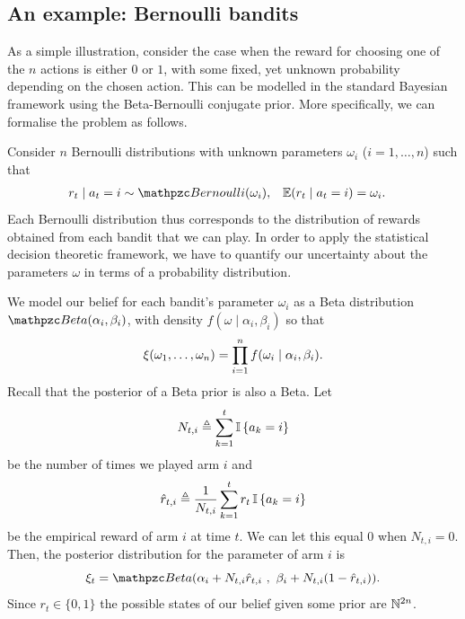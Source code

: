 \subsection{An example: Bernoulli bandits}
\label{sec:bernoulli-bandit-example}
As a simple illustration, consider the case when the reward for choosing one of the $n$ actions is either $0$ or $1$, with some fixed, yet unknown probability depending on the chosen action. This can be modelled in the standard Bayesian framework using the Beta-Bernoulli conjugate prior. More specifically, we can formalise the problem as follows.

Consider $n$ Bernoulli distributions with
unknown parameters $\omega_i$ ($i = 1, \ldots, n$) such that 
\begin{align}
  r_t \mid a_t = i &\sim
                     \Bernoulli(\omega_i),
  &
    \E(r_t  \mid a_t = i) &= \omega_i.
\end{align}
Each Bernoulli distribution thus corresponds to the distribution of
rewards obtained from each bandit that we can play.  In order to
apply the statistical decision theoretic framework, we have to
quantify our uncertainty about the parameters $\omega$ in terms of a
probability distribution.

We model our belief for each bandit's
parameter $\omega_i$ as a Beta distribution $\BetaDist(\alpha_i,
\beta_i)$, with density $f(\omega \mid \alpha_i, \beta_i)$ so that
\[
\xi(\omega_1, \ldots, \omega_n)
=
\prod_{i=1}^n f(\omega_i \mid \alpha_i, \beta_i).
\]
Recall that the posterior of a Beta prior is also a Beta. Let
\[
N_{t,i} \mathrel{\triangleq} \sum_{k=1}^t \mathop{\mbox{\ensuremath{\mathbb{I}}}}\left\{a_k = i\right\}
\]
be the number of times we played arm $i$ and
\[
\hat{r}_{t,i} \mathrel{\triangleq} \frac{1}{N_{t,i}} \sum_{k=1}^t r_t \mathop{\mbox{\ensuremath{\mathbb{I}}}}\left\{a_k = i\right\}
\]
be the
\alert{empirical reward} of arm $i$ at time $t$. We
can let this equal $0$ when $N_{t,i} = 0$.
Then, the posterior distribution for the parameter of arm $i$ is
\[
\bel_t = \BetaDist(\alpha_i + N_{t,i} \hat{r}_{t,i}~,~ \beta_i + N_{t,i} (1 - \hat{r}_{t,i})).
\]
Since $r_t \in \{0,1\}$ the possible states of our belief given some
prior are ${\mathbb{N}}^{2n}$.

